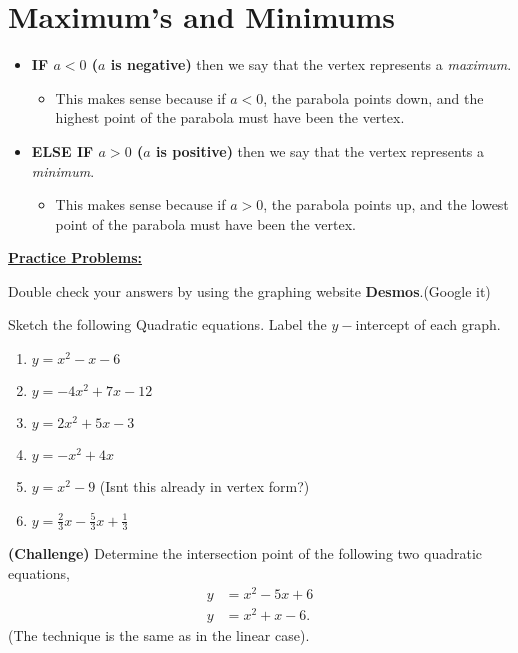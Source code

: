 \documentclass[12pt]{article} %
\begin{document}
\section{Maximum's and Minimums}
\begin{itemize}
		\item \textbf{IF $a < 0$ ($a$ is negative)} then we say that the vertex represents a \emph{maximum}.
			\begin{itemize}
				\item This makes sense because if $a < 0$, the parabola points down, and the highest point of the parabola must have been
					the vertex.
			\end{itemize}
		\item \textbf{ELSE IF $a > 0$ ($a$ is positive)} then we say that the vertex represents a \emph{minimum}.
			\begin{itemize}
				\item This makes sense because if $a > 0$, the parabola points up, and the lowest point of the parabola must have been
					the vertex.
			\end{itemize}
\end{itemize}

\textbf{\underline{\Large{Practice Problems:}}}

Double check your answers by using the graphing website \textbf{Desmos}.(Google it)
\begin{qstn}
	Sketch the following Quadratic equations. Label the $y-$intercept of each graph.
	\begin{enumerate}[label=(\alph*)]
		\item $y = x^2 - x - 6$
		\item $y = -4x^2 + 7x - 12$
		\item $y = 2x^2 + 5x - 3$
		\item $y = -x^2 + 4x$
		\item $y = x^2 - 9$ (Isnt this already in vertex form?)
		\item $y = \frac{2}{3}x - \frac{5}{3}x + \frac{1}{3}$
	\end{enumerate}
\end{qstn}
\begin{qstn}
	\textbf{(Challenge)} Determine the intersection point of the following two quadratic equations,
	\begin{align*}
		y &= x^2 - 5x + 6\\
		y &= x^2 + x - 6	
	.\end{align*}
	(The technique is the same as in the linear case).
	
\end{qstn}
\end{document}
